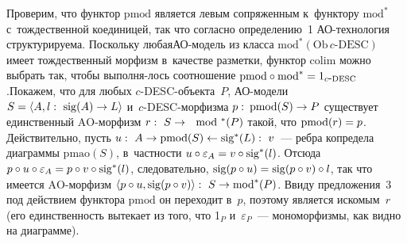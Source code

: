 \begin{multicols}{2}
 Проверим, что функтор $\mathrm{pmod}$ является левым сопряженным к~функтору
$\mathrm{mod}^*$ с~тождественной коединицей, так что согласно определению~1
 АО-тех\-но\-ло\-гия структурируема. Поскольку любая\linebreak АО-мо\-дель из
класса $\mathrm{mod}^*(\mathrm{Ob}\, c\mbox{-}\mathrm{DESC})$ имеет тож\-де\-ст\-вен\-ный морфизм
в~качестве разметки, функтор $\mathrm{colim}$ можно выбрать так, чтобы выполня-\linebreak лось
соотношение $\mathrm{pmod} \circ \mathrm{mod}^* \hm= 1_{c\mbox{-}\mathrm{DESC}}$.\linebreak Покажем, что для любых
$c$-DESC-объ\-ек\-та~$P$, АО-мо\-де\-ли $S \hm= \langle A, l:\ \mathrm{sig}(A) \hm\to
L\rangle$ и~$c$-DESC-мор\-физ\-ма $p:\: \mathrm{pmod}(S) \hm\to P$ существует
единственный $\mathrm{AO}$-мор\-физм $r:\ S \hm\to \mod^*(P)$ такой, что
$\mathrm{pmod}(r)
\hm= p$. Действительно, пусть $u:\ A \hm\to \mathrm{pmod}(S) \leftarrow \mathrm{sig}^*(L):\ v$~---
ребра копредела диаграммы $\mathrm{pmao}(S)$, в~част\-ности $u \circ \varepsilon_A\hm
= v \circ \mathrm{sig}^*(l)$. Отсюда $p\circ u \circ\varepsilon_A\hm = p\circ v \circ \mathrm{sig}^*(l)$,
следовательно, $\mathrm{sig}(p\circ u) \hm= \mathrm{sig}(p\circ v) \circ l$, так что имеется
 $\mathrm{AO}$-мор\-физм $\langle p \circ u, \mathrm{sig}(p \circ v)\rangle:\ S \hm\to
 \mathrm{mod}^*(P)$.
Ввиду предложения~3 под действием функтора $\mathrm{pmod}$ он переходит в~$p$,
поэтому является искомым~$r$ (его единственность вытекает из того, что
1$_P$ и~$\varepsilon_P$~--- мономорфизмы, как видно на диаграмме).

 \begin{center}
 \mbox{%
 \epsfxsize=53.822mm
 }
 \end{center}



\end{multicols}
